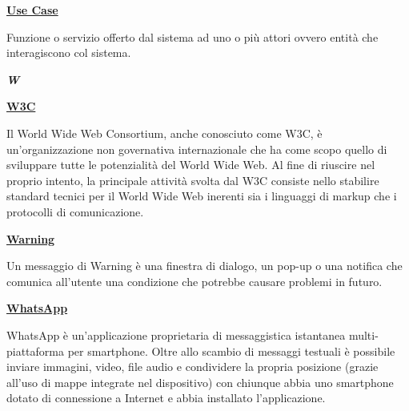 \bigskip
\begin{addmargin}[0em]{0em}
	\textbf{\underline{Use Case}} 
\end{addmargin}

\medskip
\begin{addmargin}[5em]{1em}
Funzione o servizio offerto dal sistema ad uno o più attori ovvero entità che interagiscono col sistema.
\end{addmargin}	

\newpage

\cleardoublepage
{}
{}
\noindent\hrulefill\hspace{4mm}\textbf{\textsl{\Huge{W}}}\hspace{4mm}\hrulefill
\vspace*{2\bigskipamount}

\begin{addmargin}[0em]{0em}
	\textbf{\underline{W3C}}
\end{addmargin}

\medskip
\begin{addmargin}[5em]{1em}
Il World Wide Web Consortium, anche conosciuto come W3C, è un'organizzazione non governativa internazionale che ha come scopo quello di sviluppare tutte le potenzialità del World Wide Web. Al fine di riuscire nel proprio intento, la principale attività svolta dal W3C consiste nello stabilire standard tecnici per il World Wide Web inerenti sia i linguaggi di markup che i protocolli di comunicazione.
\end{addmargin}

\bigskip
\begin{addmargin}[0em]{0em}
	\textbf{\underline{Warning}}
\end{addmargin} 

\medskip
\begin{addmargin}[5em]{1em}
Un messaggio di Warning è una finestra di dialogo, un pop-up o una notifica che comunica all'utente una condizione che potrebbe causare problemi in futuro.
\end{addmargin}
	
\bigskip
\begin{addmargin}[0em]{0em}
	\textbf{\underline{WhatsApp}}
\end{addmargin} 

\medskip
\begin{addmargin}[5em]{1em}
WhatsApp è un'applicazione proprietaria di messaggistica istantanea multi-piattaforma per smartphone. Oltre allo scambio di messaggi testuali è possibile inviare immagini, video, file audio e condividere la propria posizione (grazie all'uso di mappe integrate nel dispositivo) con chiunque abbia uno smartphone dotato di connessione a Internet e abbia installato l'applicazione.
\end{addmargin}

